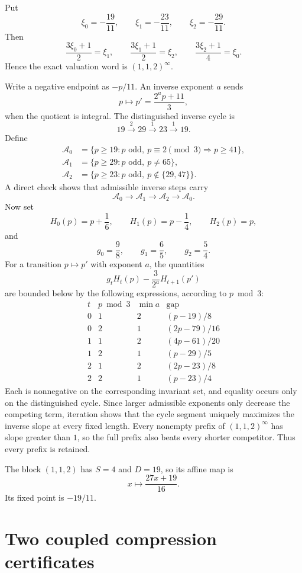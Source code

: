 \documentclass[11pt,reqno]{amsart}
\numberwithin{equation}{section}
\theoremstyle{definition}
\theoremstyle{remark}
\begin{document}
Put
\[
 \xi_0=-\frac{19}{11},
 \qquad
 \xi_1=-\frac{23}{11},
 \qquad
 \xi_2=-\frac{29}{11}.
\]
Then
\[
 \frac{3\xi_0+1}{2}=\xi_1,
 \qquad
 \frac{3\xi_1+1}{2}=\xi_2,
 \qquad
 \frac{3\xi_2+1}{4}=\xi_0.
\]
Hence the exact valuation word is $(1,1,2)^\infty$.

Write a negative endpoint as $-p/11$.  An inverse exponent $a$ sends
\[
 p\longmapsto p'=\frac{2^ap+11}{3},
\]
when the quotient is integral.  The distinguished inverse cycle is
\[
 19\xrightarrow{2}29\xrightarrow{1}23\xrightarrow{1}19.
\]
Define
\[
\begin{aligned}
 \mathcal A_0&=\{p\ge19:p\text{ odd},\ p\equiv2\pmod3\Rightarrow p\ge41\},\\
 \mathcal A_1&=\{p\ge29:p\text{ odd},\ p\ne65\},\\
 \mathcal A_2&=\{p\ge23:p\text{ odd},\ p\notin\{29,47\}\}.
\end{aligned}
\]
A direct check shows that admissible inverse steps carry
\[
 \mathcal A_0\to\mathcal A_1\to\mathcal A_2\to\mathcal A_0.
\]
Now set
\[
 H_0(p)=p+\frac16,
 \qquad
 H_1(p)=p-\frac14,
 \qquad
 H_2(p)=p,
\]
and
\[
 g_0=\frac98,
 \qquad
 g_1=\frac65,
 \qquad
 g_2=\frac54.
\]
For a transition $p\mapsto p'$ with exponent $a$, the quantities
\[
 g_tH_t(p)-\frac3{2^a}H_{t+1}(p')
\]
are bounded below by the following expressions, according to $p\bmod3$:
\[
\begin{array}{c|c|c|c}
 t&p\bmod3&\min a&\text{gap}\\ \hline
 0&1&2&(p-19)/8\\
 0&2&1&(2p-79)/16\\
 1&1&2&(4p-61)/20\\
 1&2&1&(p-29)/5\\
 2&1&2&(2p-23)/8\\
 2&2&1&(p-23)/4
\end{array}
\]
Each is nonnegative on the corresponding invariant set, and equality occurs only on the distinguished cycle.  Since larger admissible exponents only decrease the competing term, iteration shows that the cycle segment uniquely maximizes the inverse slope at every fixed length.  Every nonempty prefix of $(1,1,2)^\infty$ has slope greater than $1$, so the full prefix also beats every shorter competitor.  Thus every prefix is retained.

The block $(1,1,2)$ has $S=4$ and $D=19$, so its affine map is
\[
 x\longmapsto\frac{27x+19}{16}.
\]
Its fixed point is $-19/11$.

\section{Two coupled compression certificates}\label{app:certificates}
\end{document}
